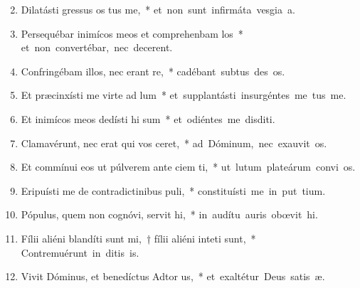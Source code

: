 \begin{flushleft}
\begin{enumerate}[leftmargin=*]
\setcounter{enumi}{1}

\item Dilatásti gressus os tus me,~* \mbox{et non sunt infirmáta vesgia a.}

\item Persequébar inimícos meos et comprehenbam los~* \mbox{et non convertébar, nec decerent.}

\item Confringébam illos, nec erant re,~* \mbox{cadébant subtus des os.}

\item Et præcinxísti me virte ad lum~* \mbox{et supplantásti insurgéntes  me tus me.}

\item Et inimícos meos dedísti hi sum~* \mbox{et odiéntes me disditi.}

\item Clamavérunt, nec erat qui vos ceret,~* \mbox{ad Dóminum, nec exauvit os.}

\item Et commínui eos ut púlverem ante ciem ti,~* \mbox{ut lutum plateárum convi os.}

\item Eripuísti me de contradictinibus puli,~* \mbox{constituísti me in put tium.}

\item Pópulus, quem non cognóvi, servit hi,~* \mbox{in audítu auris obœvit hi.}

\item Fílii aliéni blandíti sunt mi,~† fílii aliéni inteti sunt,~* \mbox{Contremuérunt in ditis is.}

\item Vivit Dóminus, et benedíctus Adtor us,~* \mbox{et exaltétur Deus satis æ.}


\end{enumerate}
\end{flushleft}
